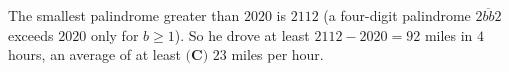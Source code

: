 The smallest palindrome greater than $2020$ is $2112$ (a four-digit palindrome $\overline{2bb2}$ exceeds $2020$ only for $b\ge1$). So he drove at least $2112-2020=92$ miles in $4$ hours, an average of at least $\boxed{\textbf{(C) }23}$ miles per hour.
